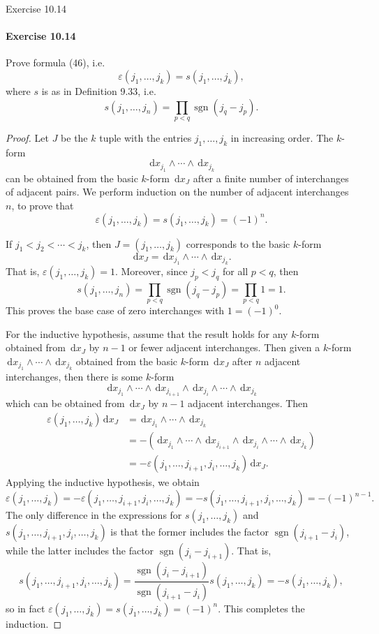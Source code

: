 \documentclass[12pt]{article}
\newenvironment{fullbox}{\begin{lrbox}{\savefullbox}\begin{minipage}{\dimexpr\textwidth-2\fboxsep\relax}}{\end{minipage}\end{lrbox}\begin{center}\framebox[\textwidth]{\usebox{\savefullbox}}\end{center}}
\newenvironment{pbox}[1][]{\begin{fullbox}\ifx#1\empty\else\paragraph{#1}\fi}{\end{fullbox}}
\newcommand{\eps}{\varepsilon}
\newcommand{\<}{\langle}
\renewcommand{\>}{\rangle}
\newcommand{\dd}[1]{\,\mathrm{d}#1}
\begin{document}
\newpage
\begin{pbox}[Exercise 10.14]
    Prove formula (46), i.e. 
    \[
        \eps(j_1,\dots,j_k) = s(j_1,\dots,j_k),
    \]
    where $s$ is as in Definition 9.33, i.e.
    \[
        s(j_1,\dots,j_n) = \prod_{p<q} \operatorname{sgn}(j_q-j_p).
    \]
\end{pbox}

\begin{proof}
    Let $J$ be the $k$ tuple with the entries $j_1, \dots, j_k$ in increasing order. The $k$-form
    \[
        \dd{x_{j_1}} \wedge \cdots \wedge \dd{x_{j_k}}
    \]
    can be obtained from the basic $k$-form $\dd{x_J}$ after a finite number of interchanges of adjacent pairs. We perform induction on the number of adjacent interchanges $n$, to prove that
    \[
        \eps(j_1,\dots,j_k) = s(j_1,\dots,j_k) = (-1)^n.
    \]

    If $j_1 < j_2 < \cdots < j_k$, then $J = (j_1, \dots, j_k)$ corresponds to the basic $k$-form
    \[
        \dd{x_J} = \dd{x_{j_1}} \wedge \cdots \wedge \dd{x_{j_k}}.
    \]
    That is, $\eps(j_1, \dots, j_k) = 1$. Moreover, since $j_p < j_q$ for all $p < q$, then
    \[
        s(j_1,\dots,j_n)
            = \prod_{p<q} \operatorname{sgn}(j_q-j_p)
            = \prod_{p<q} 1
            = 1.
    \]
    This proves the base case of zero interchanges with $1 = (-1)^0$.

    For the inductive hypothesis, assume that the result holds for any $k$-form obtained from $\dd{x_J}$ by $n-1$ or fewer adjacent interchanges. Then given a $k$-form $\dd{x_{j_1}} \wedge \cdots \wedge \dd{x_{j_k}}$ obtained from the basic $k$-form $\dd{x_J}$ after $n$ adjacent interchanges, then there is some $k$-form
    \[
        \dd{x_{j_1}} \wedge \cdots \wedge \dd{x_{j_{i+1}}} \wedge \dd{x_{j_i}} \wedge \cdots \wedge \dd{x_{j_k}}
    \]
    which can be obtained from $\dd{x_J}$ by $n - 1$ adjacent interchanges. Then
    \begin{align*}
        \eps(j_1, \dots, j_k) \dd{x_J}
            &= \dd{x_{j_1}} \wedge \cdots \wedge \dd{x_{j_k}} \\
            &= -(\dd{x_{j_1}} \wedge \cdots \wedge \dd{x_{j_{i+1}}} \wedge \dd{x_{j_i}} \wedge \cdots \wedge \dd{x_{j_k}}) \\
            &= -\eps(j_1, \dots, j_{i+1}, j_i, \dots, j_k) \dd{x_J}.
    \end{align*}
    Applying the inductive hypothesis, we obtain
    \[
        \eps(j_1, \dots, j_k)
            = -\eps(j_1, \dots, j_{i+1}, j_i, \dots, j_k)
            = -s(j_1, \dots, j_{i+1}, j_i, \dots, j_k)
            = -(-1)^{n-1}.
    \]
    The only difference in the expressions for $s(j_1, \dots, j_k)$ and $s(j_1, \dots, j_{i+1}, j_i, \dots, j_k)$ is that the former includes the factor $\operatorname{sgn}(j_{i+1} - j_i)$, while the latter includes the factor $\operatorname{sgn}(j_i - j_{i+1})$. That is,
    \[
        s(j_1, \dots, j_{i+1}, j_i, \dots, j_k)
            = \frac{\operatorname{sgn}(j_i - j_{i+1})}{\operatorname{sgn}(j_{i+1} - j_i)} s(j_1, \dots, j_k)
            = -s(j_1, \dots, j_k),
    \]
    so in fact $\eps(j_1, \dots, j_k) = s(j_1, \dots, j_k) = (-1)^n$. This completes the induction.
    


\end{proof}
\end{document}
